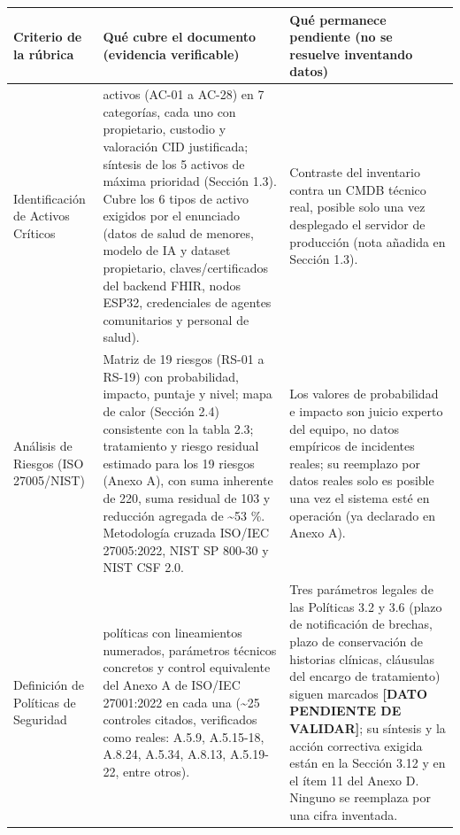 \documentclass[11pt,a4paper]{article}
\begin{document}
{\small
\begin{longtable}[]{@{}
  >{\raggedright\arraybackslash}p{}
  >{\raggedright\arraybackslash}p{}
  >{\raggedright\arraybackslash}p{}@{}}
\toprule\noalign{}
\begin{minipage}[b]{\linewidth}\raggedright
Criterio de la rúbrica
\end{minipage} & \begin{minipage}[b]{\linewidth}\raggedright
Qué cubre el documento (evidencia verificable)
\end{minipage} & \begin{minipage}[b]{\linewidth}\raggedright
Qué permanece pendiente (no se resuelve inventando datos)
\end{minipage} \\
\midrule\noalign{}
\endhead
\bottomrule\noalign{}
\endlastfoot
Identificación de Activos Críticos & 28 activos (AC-01 a AC-28) en 7 categorías, cada uno con propietario, custodio y valoración CID justificada; síntesis de los 5 activos de máxima prioridad (Sección 1.3). Cubre los 6 tipos de activo exigidos por el enunciado (datos de salud de menores, modelo de IA y dataset propietario, claves/certificados del backend FHIR, nodos ESP32, credenciales de agentes comunitarios y personal de salud). & Contraste del inventario contra un CMDB técnico real, posible solo una vez desplegado el servidor de producción (nota añadida en Sección 1.3). \\
Análisis de Riesgos (ISO 27005/NIST) & Matriz de 19 riesgos (RS-01 a RS-19) con probabilidad, impacto, puntaje y nivel; mapa de calor (Sección 2.4) consistente con la tabla 2.3; tratamiento y riesgo residual estimado para los 19 riesgos (Anexo A), con suma inherente de 220, suma residual de 103 y reducción agregada de \textasciitilde53 \%. Metodología cruzada ISO/IEC 27005:2022, NIST SP 800-30 y NIST CSF 2.0. & Los valores de probabilidad e impacto son juicio experto del equipo, no datos empíricos de incidentes reales; su reemplazo por datos reales solo es posible una vez el sistema esté en operación (ya declarado en Anexo A). \\
Definición de Políticas de Seguridad & 11 políticas con lineamientos numerados, parámetros técnicos concretos y control equivalente del Anexo A de ISO/IEC 27001:2022 en cada una (\textasciitilde25 controles citados, verificados como reales: A.5.9, A.5.15-18, A.8.24, A.5.34, A.8.13, A.5.19-22, entre otros). & Tres parámetros legales de las Políticas 3.2 y 3.6 (plazo de notificación de brechas, plazo de conservación de historias clínicas, cláusulas del encargo de tratamiento) siguen marcados \textbf{{[}DATO PENDIENTE DE VALIDAR{]}}; su síntesis y la acción correctiva exigida están en la Sección 3.12 y en el ítem 11 del Anexo D. Ninguno se reemplaza por una cifra inventada. \\

\end{longtable}}
\end{document}
